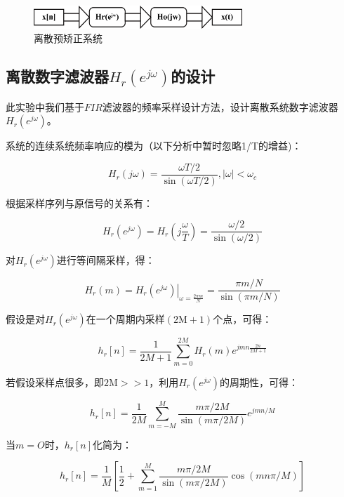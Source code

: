\documentclass{../source/Experiment}
\begin{document}
            \begin{figure}[H]
                \centering
                \includegraphics[width = 0.7\textwidth]{pic/sys2.png}
                \caption{离散预矫正系统}
            \end{figure}

        \subsection{离散数字滤波器$H_{r}\left(e^{j \omega}\right)$的设计}
        
            此实验中我们基于$FIR$滤波器的频率采样设计方法，设计离散系统数字滤波器$H_{r}\left(e^{j \omega}\right)$。
            
            系统的连续系统频率响应的模为（以下分析中暂时忽略1/T的增益)：
            
            $$H_{r}(j \omega)=\frac{\omega T / 2}{\sin (\omega T / 2)},|\omega|<\omega_{c}$$
            
            根据采样序列与原信号的关系有：
            
            $$H_{r}\left(e^{j \omega}\right)=H_{r}\left(j \frac{\omega}{T}\right)=\frac{\omega / 2}{\sin (\omega / 2)}$$

            对$H_{r}\left(e^{j \omega}\right)$进行等间隔采样，得：
            
            $$H_{r}(m)=\left.H_{r}\left(e^{j \omega}\right)\right|_{\omega = \frac{2 \pi m}{N}}=\frac{\pi m / N}{\sin (\pi m / N)}$$
                    
            假设是对$H_{r}\left(e^{j \omega}\right)$在一个周期内采样$(2 \mathrm{M}+1)$个点，可得：
            
            $$h_{r}[n]=\frac{1}{2 M+1} \sum_{m=0}^{2 M} H_r(m) e^{j m n \frac{2 n}{2 M+1}}$$
            
            若假设采样点很多，即$2 \mathrm{M}>>1$，利用$H_r\left(e^{j \omega}\right)$的周期性，可得：
            
            $$h_{r}[n]=\frac{1}{2 M} \sum_{m=-M}^{M} \frac{m \pi / 2 M}{\sin (m \pi / 2 M)} e^{j m n / M}$$
            
            当$m=O$时，$h_r[n]$化简为：
            
            $$h_{r}[n]=\frac{1}{M}\left[\frac{1}{2}+\sum_{m=1}^{M} \frac{m \pi / 2 M}{\sin (m \pi / 2 M)} \cos (m n \pi / M)\right]$$
            
\end{document}
